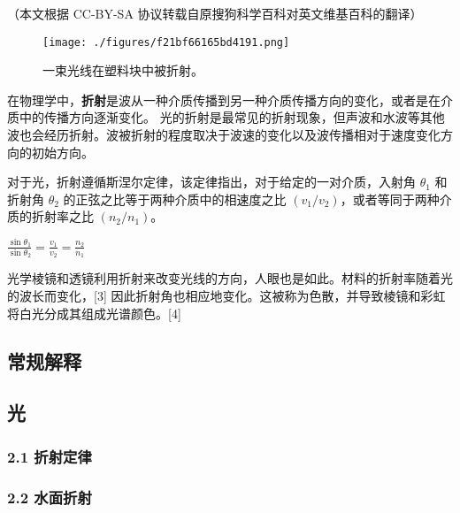 
（本文根据 CC-BY-SA 协议转载自原搜狗科学百科对英文维基百科的翻译）

\begin{figure}[ht]
\centering
\texttt{[image: ./figures/f21bf66165bd4191.png]}
\caption{一束光线在塑料块中被折射。} \label{fig_ZS_1}
\end{figure}

在物理学中，\textbf{折射}是波从一种介质传播到另一种介质传播方向的变化，或者是在介质中的传播方向逐渐变化。 光的折射是最常见的折射现象，但声波和水波等其他波也会经历折射。波被折射的程度取决于波速的变化以及波传播相对于速度变化方向的初始方向。

对于光，折射遵循斯涅尔定律，该定律指出，对于给定的一对介质，入射角 $\theta_1$ 和折射角 $\theta_2$ 的正弦之比等于两种介质中的相速度之比 $(v_1 / v_2)$，或者等同于两种介质的折射率之比 $(n_2 / n_1)$。

$\frac{\sin \theta_1}{\sin \theta_2} = \frac{v_1}{v_2} = \frac{n_2}{n_1}$

光学棱镜和透镜利用折射来改变光线的方向，人眼也是如此。材料的折射率随着光的波长而变化，[3] 因此折射角也相应地变化。这被称为色散，并导致棱镜和彩虹将白光分成其组成光谱颜色。[4]

\subsection{常规解释}

\subsection{光}

\subsubsection{2.1 折射定律}

\subsubsection{2.2 水面折射}

